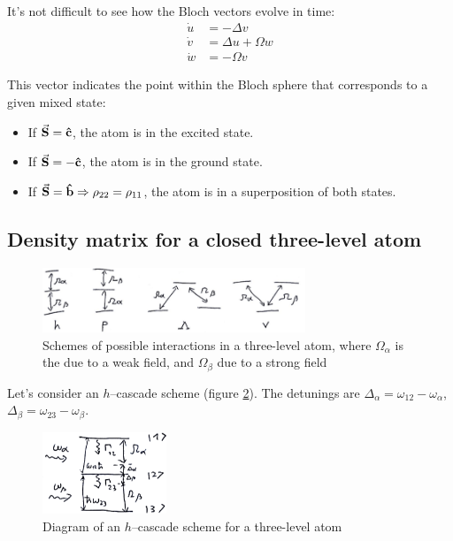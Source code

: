 It's not difficult to see how the Bloch vectors evolve in time:
\begin{subequations}
\begin{align}
	\dot{u} &= -\Delta v \\
	\dot{v} &= \Delta u + \Omega w \\
	\dot{w} &= -\Omega v
\end{align}
\end{subequations}

This vector indicates the point within the Bloch sphere that corresponds to a given mixed state:
\begin{itemize}
	\item If $\va{S} = \vu{c}$, the atom is in the excited state.
	\item If $\va{S} = -\vu{c}$, the atom is in the ground state.
	\item If $\va{S} = \vu{b} \Rightarrow \rho_{22} = \rho_{11}$, the atom is in a superposition of both states.
\end{itemize}

\subsection{Density matrix for a closed three-level atom}
\begin{figure}[H]
	\centering
	\includegraphics[width=0.7\textwidth]{./images/3-three-level-schemes2}
	\caption{Schemes of possible interactions in a three-level atom, where $\Omega_{\alpha}$ is the due to a weak field, and $\Omega_{\beta}$ due to a strong field}
	\label{fig:three-level-schemes2}
\end{figure}

Let's consider an $h$--cascade scheme (figure \ref{fig:h-scheme}). The detunings are $\Delta_{\alpha} = \omega_{12} - \omega_{\alpha}$, $\Delta_{\beta} = \omega_{23} - \omega_{\beta}$.
\begin{figure}[H]
	\centering
	\includegraphics[width=0.33\textwidth]{./images/3-h-scheme}
	\caption{Diagram of an $h$--cascade scheme for a three-level atom}
	\label{fig:h-scheme}
\end{figure}

